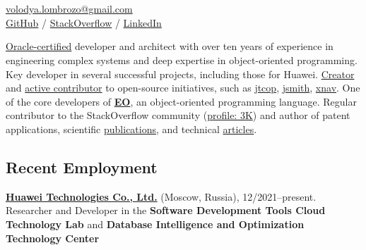 \documentclass{vl}
\begin{document}
    \vlPrintPhoto{}

    \section*{\Large {}}

    \href{mailto:volodya.lombrozo@gmail.com}{volodya.lombrozo@gmail.com}\\%
    \href{https://github.com/volodya-lombrozo}{GitHub} /
    \href{https://stackoverflow.com/users/10423604/volodya-lombrozo}{StackOverflow} /
    \href{https://www.linkedin.com/in/vladimir-zakharov-lombrozo-b71744216/}{LinkedIn}

    \vspace*{12pt}

    \href{https://catalog-education.oracle.com/pls/certview/sharebadge?id=87F6A2FE819A5A5AF4120A05900AB28A461EE9A3EE9FBFA02721FADAEB3BCE19}{Oracle-certified}
    developer and architect with over ten years of experience in engineering complex systems
    and deep expertise in object-oriented programming.
    Key developer in several successful projects, including those for Huawei.
    \href{https://github.com/volodya-lombrozo?tab=repositories}{Creator} and
    \href{https://github.com/volodya-lombrozo}{active contributor} to open-source initiatives, such as
    \href{https://github.com/volodya-lombrozo/jtcop}{jtcop},
    \href{https://github.com/volodya-lombrozo/jsmith}{jsmith},
    \href{https://github.com/volodya-lombrozo/xnav}{xnav}.
    One of the core developers of \textbf{\href{https://www.eolang.org}{EO}}, an object-oriented programming language.
    Regular contributor to the StackOverflow community
    (\href{https://stackoverflow.com/users/10423604/volodya-lombrozo}{profile: 3K}) and
    author of patent applications, scientific \href{https://arxiv.org/abs/2410.05631}{publications}, and technical
    \href{https://dzone.com/users/4993224/volodya-lombrozo.html}{articles}.

    \subsection*{Recent Employment}

    \textbf{\href{https://www.huawei.com}{Huawei Technologies Co., Ltd.}} (Moscow, Russia), 12/2021--present.
    Researcher and Developer in the \textbf{Software Development Tools Cloud Technology Lab} and
    \textbf{Database Intelligence and Optimization Technology Center}
\end{document}
